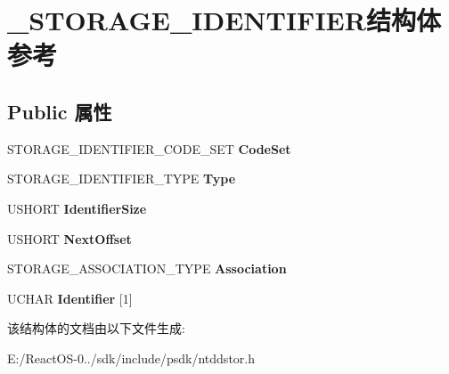 \hypertarget{struct___s_t_o_r_a_g_e___i_d_e_n_t_i_f_i_e_r}{}\section{\+\_\+\+S\+T\+O\+R\+A\+G\+E\+\_\+\+I\+D\+E\+N\+T\+I\+F\+I\+E\+R结构体 参考}
\label{struct___s_t_o_r_a_g_e___i_d_e_n_t_i_f_i_e_r}
\subsection*{Public 属性}
\begin{DoxyCompactItemize}
\item 
\mbox{\label{struct___s_t_o_r_a_g_e___i_d_e_n_t_i_f_i_e_r_a0ab68d91bdbfd97f52cb2889dc022514}} 
S\+T\+O\+R\+A\+G\+E\+\_\+\+I\+D\+E\+N\+T\+I\+F\+I\+E\+R\+\_\+\+C\+O\+D\+E\+\_\+\+S\+ET {\bfseries Code\+Set}
\item 
\mbox{\label{struct___s_t_o_r_a_g_e___i_d_e_n_t_i_f_i_e_r_a748eb07af72117d666f233adb259c36b}} 
S\+T\+O\+R\+A\+G\+E\+\_\+\+I\+D\+E\+N\+T\+I\+F\+I\+E\+R\+\_\+\+T\+Y\+PE {\bfseries Type}
\item 
\mbox{\label{struct___s_t_o_r_a_g_e___i_d_e_n_t_i_f_i_e_r_a054ccb254c3b377b08002d5b62488f7d}} 
U\+S\+H\+O\+RT {\bfseries Identifier\+Size}
\item 
\mbox{\label{struct___s_t_o_r_a_g_e___i_d_e_n_t_i_f_i_e_r_a410971114cb2bd8d0df90addb671c183}} 
U\+S\+H\+O\+RT {\bfseries Next\+Offset}
\item 
\mbox{\label{struct___s_t_o_r_a_g_e___i_d_e_n_t_i_f_i_e_r_a19490a3c427ad24dc3d5c3f1a2d8ab0f}} 
S\+T\+O\+R\+A\+G\+E\+\_\+\+A\+S\+S\+O\+C\+I\+A\+T\+I\+O\+N\+\_\+\+T\+Y\+PE {\bfseries Association}
\item 
\mbox{\label{struct___s_t_o_r_a_g_e___i_d_e_n_t_i_f_i_e_r_acfbbae8cd8cd7b150d4f115977f23d03}} 
U\+C\+H\+AR {\bfseries Identifier} \mbox{[}1\mbox{]}
\end{DoxyCompactItemize}


该结构体的文档由以下文件生成\+:\begin{DoxyCompactItemize}
\item 
E\+:/\+React\+O\+S-\/0../sdk/include/psdk/ntddstor.\+h\end{DoxyCompactItemize}
